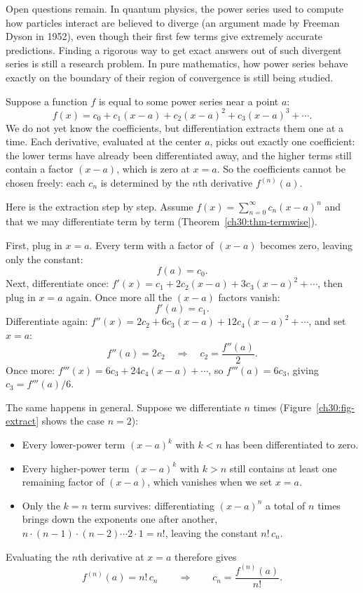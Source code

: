 \begin{historybox}
Open questions remain. In quantum physics, the power series used to compute how particles interact are believed to diverge (an argument made by Freeman Dyson in 1952), even though their first few terms give extremely accurate predictions. Finding a rigorous way to get exact answers out of such divergent series is still a research problem. In pure mathematics, how power series behave exactly on the boundary of their region of convergence is still being studied.
\end{historybox}

\begin{intuitionbox}
Suppose a function $f$ is equal to some power series near a point $a$:
\[
  f(x) = c_0 + c_1(x-a) + c_2(x-a)^2 + c_3(x-a)^3 + \cdots.
\]
We do not yet know the coefficients, but differentiation extracts them one at a time. Each derivative, evaluated at the center $a$, picks out exactly one coefficient: the lower terms have already been differentiated away, and the higher terms still contain a factor $(x-a)$, which is zero at $x=a$. So the coefficients cannot be chosen freely: each $c_n$ is determined by the $n$th derivative $f^{(n)}(a)$.
\end{intuitionbox}

Here is the extraction step by step. Assume $f(x) = \sum_{n=0}^\infty c_n (x-a)^n$ and that we may differentiate term by term (Theorem~\ref{ch30:thm-termwise}).

First, plug in $x = a$. Every term with a factor of $(x-a)$ becomes zero, leaving only the constant:
\[
  f(a) = c_0.
\]
Next, differentiate once: $f'(x) = c_1 + 2c_2(x-a) + 3c_3(x-a)^2 + \cdots$, then plug in $x=a$ again. Once more all the $(x-a)$ factors vanish:
\[
  f'(a) = c_1.
\]
Differentiate again: $f''(x) = 2c_2 + 6c_3(x-a) + 12 c_4 (x-a)^2 + \cdots$, and set $x=a$:
\[
  f''(a) = 2c_2 \quad\Longrightarrow\quad c_2 = \frac{f''(a)}{2}.
\]
Once more: $f'''(x) = 6 c_3 + 24 c_4 (x-a) + \cdots$, so $f'''(a) = 6 c_3$, giving $c_3 = f'''(a)/6$.

The same happens in general. Suppose we differentiate $n$ times (Figure~\ref{ch30:fig-extract} shows the case $n=2$):
\begin{itemize}
  \item Every lower-power term $(x-a)^k$ with $k < n$ has been differentiated to zero.
  \item Every higher-power term $(x-a)^k$ with $k > n$ still contains at least one remaining factor of $(x-a)$, which vanishes when we set $x = a$.
  \item Only the $k = n$ term survives: differentiating $(x-a)^n$ a total of $n$ times brings down the exponents one after another, $n\cdot(n-1)\cdot(n-2)\cdots 2\cdot 1 = n!$, leaving the constant $n!\, c_n$.
\end{itemize}
Evaluating the $n$th derivative at $x = a$ therefore gives
\[
  f^{(n)}(a) = n!\, c_n \qquad\Longrightarrow\qquad c_n = \frac{f^{(n)}(a)}{n!}.
\]

